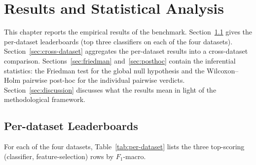 \chapter{Results and Statistical Analysis}\doublespacing
\label{Chapter5}

This chapter reports the empirical results of the benchmark.
Section~\ref{sec:per-dataset} gives the per-dataset leaderboards
(top three classifiers on each of the four datasets).
Section~\ref{sec:cross-dataset} aggregates the per-dataset results
into a cross-dataset comparison. Sections~\ref{sec:friedman}
and~\ref{sec:posthoc} contain the inferential statistics: the
Friedman test for the global null hypothesis and the
Wilcoxon--Holm pairwise post-hoc for the individual pairwise
verdicts. Section~\ref{sec:discussion} discusses what the results
mean in light of the methodological framework.

\section{Per-dataset Leaderboards}
\label{sec:per-dataset}

For each of the four datasets, Table~\ref{tab:per-dataset} lists the
three top-scoring (classifier, feature-selection) rows by
$F_1$-macro.

